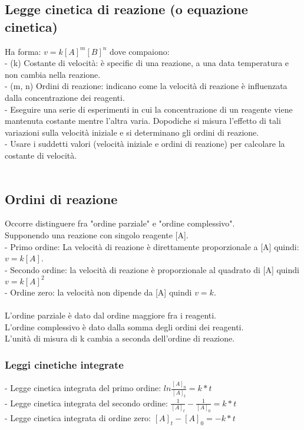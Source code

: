 \subsection{Legge cinetica di reazione (o equazione cinetica)}
Ha forma: $v = k [A]^m [B]^n$ dove compaiono:\\
\tab- (k) Costante di velocità: è specific di una reazione, a una data temperatura e non cambia nella reazione.\\
\tab- (m, n) Ordini di reazione: indicano come la velocità di reazione è influenzata dalla concentrazione dei reagenti.\\
\tab- Eseguire una serie di esperimenti in cui la concentrazione di un reagente viene mantenuta costante mentre l'altra varia. Dopodiche si misura l'effetto di tali variazioni sulla velocità iniziale e si determinano gli ordini di reazione.\\
\tab- Usare i suddetti valori (velocità iniziale e ordini di reazione) per calcolare la costante di velocità.\\\\
\subsection{Ordini di reazione}
Occorre distinguere fra "ordine parziale" e "ordine complessivo".\\
Supponendo una reazione con singolo reagente [A].\\
\tab- Primo ordine: La velocità di reazione è direttamente proporzionale a [A] quindi: $v = k[A]$.\\
\tab- Secondo ordine: la velocità di reazione è proporzionale al quadrato di [A] quindi $v = k[A]^2$\\
\tab- Ordine zero: la velocità non dipende da [A] quindi $v = k$.\\\\
L'ordine parziale è dato dal ordine maggiore fra i reagenti.\\
L'ordine complessivo è dato dalla somma degli ordini dei reagenti.\\
L'unità di misura di k cambia a seconda dell'ordine di reazione.\\
\subsubsection{Leggi cinetiche integrate}
\tab- Legge cinetica integrata del primo ordine: $ln\frac{[A]_0}{[A]_t} = k* t$\\
\tab- Legge cinetica integrata del secondo ordine: $\frac{1}{[A]_t}-\frac{1}{[A]_0} = k* t$\\
\tab- Legge cinetica integrata di ordine zero: $[A]_t - [A]_0 = -k*t$\\\\
